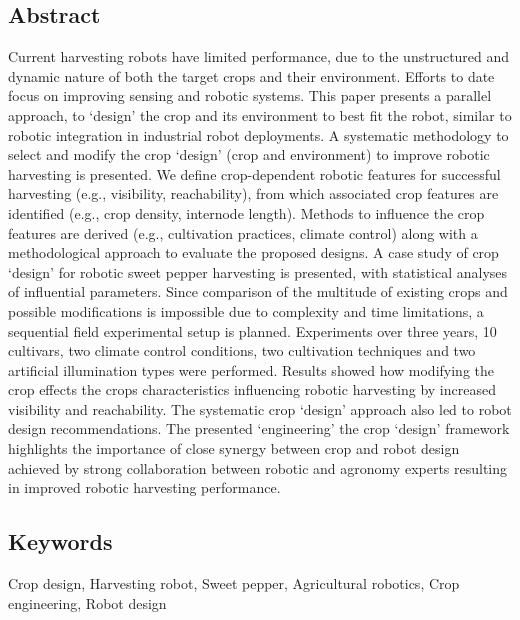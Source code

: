     \subsection*{Abstract}
    Current harvesting robots have limited performance, due to the unstructured and dynamic
    nature of both the target crops and their environment. Efforts to date focus on improving
    sensing and robotic systems. This paper presents a parallel approach, to ‘design’ the crop
    and its environment to best fit the robot, similar to robotic integration in industrial robot
    deployments.
    A systematic methodology to select and modify the crop ‘design’ (crop and environment) to improve robotic harvesting is presented. We define crop-dependent robotic features for successful harvesting (e.g., visibility, reachability), from which associated crop
    features are identified (e.g., crop density, internode length). Methods to influence the crop
    features are derived (e.g., cultivation practices, climate control) along with a methodological approach to evaluate the proposed designs. A case study of crop ‘design’ for robotic
    sweet pepper harvesting is presented, with statistical analyses of influential parameters.
    Since comparison of the multitude of existing crops and possible modifications is impossible due to complexity and time limitations, a sequential field experimental setup is
    planned. Experiments over three years, 10 cultivars, two climate control conditions, two
    cultivation techniques and two artificial illumination types were performed. Results
    showed how modifying the crop effects the crops characteristics influencing robotic harvesting by increased visibility and reachability. The systematic crop ‘design’ approach also
    led to robot design recommendations. The presented ‘engineering’ the crop ‘design’
    framework highlights the importance of close synergy between crop and robot design
    achieved by strong collaboration between robotic and agronomy experts resulting in
    improved robotic harvesting performance.
    
    
    \subsection*{Keywords}
    Crop design, Harvesting robot, Sweet pepper, Agricultural robotics, Crop engineering, Robot design
    
    
     
